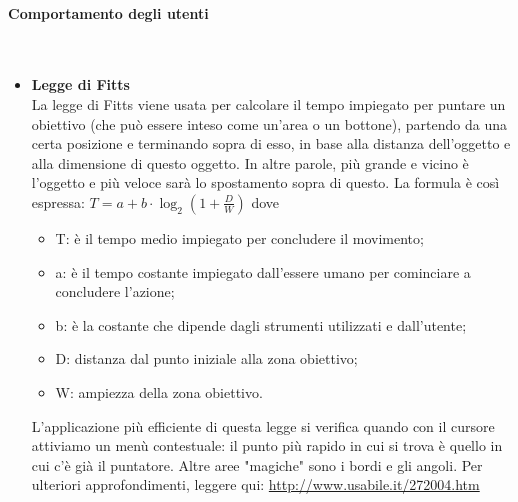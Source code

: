 \documentclass[10pt,                    %
               a4paper,                 %
               twoside,                 %
               openright,               %
               english,                 
               italian,                 
]{article}
\begin{document}
\paragraph{Comportamento degli utenti} \mbox{}\\
\begin{itemize}
\item \textbf{Legge di Fitts} \\
La legge di Fitts viene usata per calcolare il tempo impiegato per puntare
un obiettivo (che può essere inteso come un'area o un bottone), partendo
da una certa posizione e terminando sopra di esso, in base alla distanza 
dell'oggetto e alla dimensione di questo oggetto. In altre parole, più 
grande e vicino è l'oggetto e più veloce sarà lo spostamento sopra di questo.
La formula è così espressa: $T=a+b\cdot\log_{2}\left(1+\frac{D}{W} \right)$ dove
\begin{itemize}
\item T: è il tempo medio impiegato per concludere il movimento;
\item a: è il tempo costante impiegato dall'essere umano per cominciare a 
concludere l'azione;
\item b: è la costante che dipende dagli strumenti utilizzati e dall'utente;
\item D: distanza dal punto iniziale alla zona obiettivo;
\item W: ampiezza della zona obiettivo.
\end{itemize}
L'applicazione più efficiente di questa legge si verifica quando con il cursore
attiviamo un menù contestuale: il punto più rapido in cui si trova è quello in cui
c'è già il puntatore.
Altre aree "magiche" sono i bordi e gli angoli.
Per ulteriori approfondimenti, leggere qui: \url{http://www.usabile.it/272004.htm}

\end{itemize}
\end{document}
